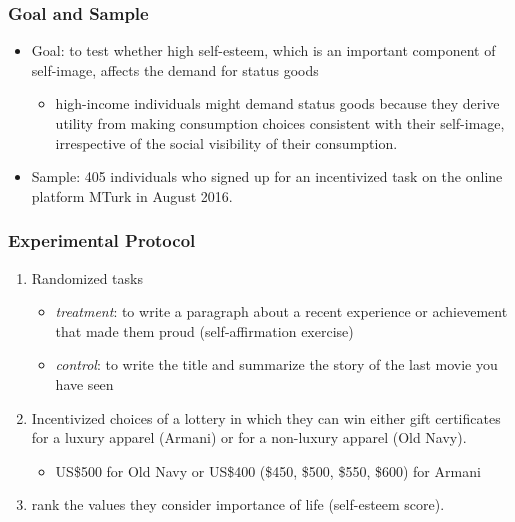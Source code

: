 \documentclass[unicode,12pt]{beamer}
\begin{document}
    \begin{frame}
        \frametitle{Goal and Sample}
    
        \begin{itemize}
            \item Goal: to test whether high self-esteem, which is an important component of self-image, affects the demand for status goods
            \begin{itemize}
                \item high-income individuals might demand status goods because they derive utility from making consumption choices consistent with their self-image, irrespective of the social visibility of their consumption. 
            \end{itemize}
            \item Sample: 405 individuals who signed up for an incentivized task on the online platform MTurk in August 2016.
        \end{itemize}
    
    \end{frame}

    \begin{frame}
        \frametitle{Experimental Protocol}
    
        \begin{enumerate}
            \item Randomized tasks
            \begin{itemize}
                \item \textit{treatment}: to write a paragraph about a recent experience or achievement that made them proud (self-affirmation exercise)
                \item \textit{control}: to write the title and summarize the story of the last movie you have seen
            \end{itemize}
            \item Incentivized choices of a lottery in which they can win either gift certificates for a luxury apparel (Armani) or for a non-luxury apparel (Old Navy).
            \begin{itemize}
                \item US\$500 for Old Navy or US\$400 (\$450, \$500, \$550, \$600) for Armani
            \end{itemize}
            \item rank the values they consider importance of life (self-esteem score).
        \end{enumerate}
    
    \end{frame}
\end{document}
